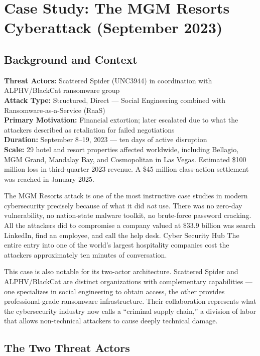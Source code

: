 \section{Case Study: The MGM Resorts Cyberattack (September 2023)}

\subsection{Background and Context}

\textbf{Threat Actors:} Scattered Spider (UNC3944) in coordination with ALPHV/BlackCat ransomware group \\
\textbf{Attack Type:} Structured, Direct — Social Engineering combined with Ransomware-as-a-Service (RaaS) \\
\textbf{Primary Motivation:} Financial extortion; later escalated due to what the attackers described as retaliation for failed negotiations \\
\textbf{Duration:} September 8--19, 2023 — ten days of active disruption \\
\textbf{Scale:} 29 hotel and resort properties affected worldwide, including Bellagio, MGM Grand, Mandalay Bay, and Cosmopolitan in Las Vegas. Estimated \$100 million loss in third-quarter 2023 revenue. A \$45 million class-action settlement was reached in January 2025.

The MGM Resorts attack is one of the most instructive case studies in modern cybersecurity precisely because of what it did \emph{not} use. There was no zero-day vulnerability, no nation-state malware toolkit, no brute-force password cracking. All the attackers did to compromise a company valued at \$33.9 billion was search LinkedIn, find an employee, and call the help desk. Cyber Security Hub The entire entry into one of the world's largest hospitality companies cost the attackers approximately ten minutes of conversation.

This case is also notable for its two-actor architecture. Scattered Spider and ALPHV/BlackCat are distinct organizations with complementary capabilities — one specializes in social engineering to obtain access, the other provides professional-grade ransomware infrastructure. Their collaboration represents what the cybersecurity industry now calls a ``criminal supply chain,'' a division of labor that allows non-technical attackers to cause deeply technical damage.



\subsection{The Two Threat Actors}


